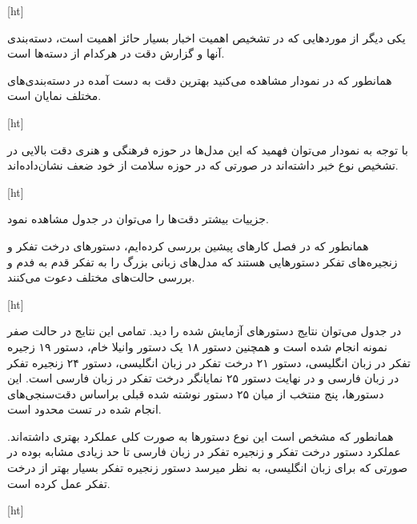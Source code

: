[ht]

\pagebreak

یکی دیگر از موردهایی که در تشخیص اهمیت اخبار بسیار حائز اهمیت است، دسته‌بندی آنها و گزارش دقت در هرکدام از دسته‌ها است.

همانطور که در نمودار  مشاهده می‌کنید بهترین دقت به دست آمده در دسته‌بندی‌های مختلف نمایان است.

[ht]

با توجه به نمودار می‌توان فهمید که این مدل‌ها در حوزه فرهنگی و هنری دقت بالایی در تشخیص نوع خبر داشته‌اند در صورتی که در حوزه سلامت از خود ضعف نشان‌داده‌اند.

[ht]

جزییات بیشتر دقت‌ها را می‌توان در جدول  مشاهده نمود.

\pagebreak
{}
همانطور که در فصل کارهای پیشین بررسی کرده‌ایم، دستورهای درخت تفکر و زنجیره‌های تفکر دستورهایی هستند که مدل‌های زبانی بزرگ را به تفکر قدم به فدم و بررسی حالت‌های مختلف دعوت می‌کنند.

[ht]

در جدول  می‌توان نتایج دستور‌های آزمایش شده را دید. تمامی این نتایج در حالت صفر نمونه انجام شده است و همچنین دستور ۱۸ یک دستور وانیلا خام، دستور ۱۹ زجیره تفکر در زبان انگلیسی، دستور ۲۱ درخت تفکر در زبان انگلیسی، دستور ۲۴ زنجیره تفکر در زبان فارسی و در نهایت دستور ۲۵ نمایانگر درخت تفکر در زبان فارسی است. این دستور‌ها، پنج منتخب از میان ۲۵ دستور نوشته شده قبلی براساس دقت‌سنجی‌های انجام شده در تست محدود است.

همانطور که مشخص است این نوع دستور‌ها به صورت کلی  عملکرد بهتری داشته‌اند. عملکرد دستور درخت تفکر و زنجیره تفکر در زبان فارسی تا حد زیادی مشابه بوده در صورتی که برای زبان انگلیسی، به نظر میرسد دستور زنجیره تفکر بسیار بهتر از درخت تفکر عمل کرده است.

[ht]

